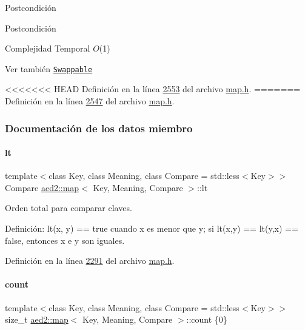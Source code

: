 \begin{DoxyPostcond}{\-Postcondición}
\begin{DoxyPostcond}{\-Postcondición}
\begin{DoxyDescription}
\item[Complejidad Temporal]$O$(1)
\end{DoxyDescription}

\begin{DoxySeeAlso}{Ver también}
\href{http://en.cppreference.com/w/cpp/concept/Swappable}{\tt Swappable} 
\end{DoxySeeAlso}


<<<<<<< HEAD
\-Definición en la línea \hyperlink{map_8h_source_l02553}{2553} del archivo \hyperlink{map_8h_source}{map.\-h}.
=======
Definición en la línea \hyperlink{map_8h_source_l02547}{2547} del archivo \hyperlink{map_8h_source}{map.\+h}.



\subsubsection{Documentación de los datos miembro}
\mbox{\label{classaed2_1_1map_a0e5be36fae0693e4665bd2a615e7550a_a0e5be36fae0693e4665bd2a615e7550a}} 
\paragraph{\texorpdfstring{lt}{lt}}
{\footnotesize\ttfamily template$<$class Key, class Meaning, class Compare = std\+::less$<$\+Key$>$$>$ \\
Compare \hyperlink{classaed2_1_1map}{aed2\+::map}$<$ Key, Meaning, Compare $>$\+::lt\hspace{0.3cm}{\ttfamily [private]}}



Orden total para comparar claves. 

Definición\+: lt(x, y) == true cuando x es menor que y; si lt(x,y) == lt(y,x) == false, entonces x e y son iguales. 

Definición en la línea \hyperlink{map_8h_source_l02291}{2291} del archivo \hyperlink{map_8h_source}{map.\+h}.

\mbox{\label{classaed2_1_1map_a44236c4f16cdc20a10759862b198bde4_a44236c4f16cdc20a10759862b198bde4}} 
\paragraph{\texorpdfstring{count}{count}}
{\footnotesize\ttfamily template$<$class Key, class Meaning, class Compare = std\+::less$<$\+Key$>$$>$ \\
size\+\_\+t \hyperlink{classaed2_1_1map}{aed2\+::map}$<$ Key, Meaning, Compare $>$\+::count \{0\}\hspace{0.3cm}{\ttfamily [private]}}


\end{DoxyPostcond}
\end{DoxyPostcond}

